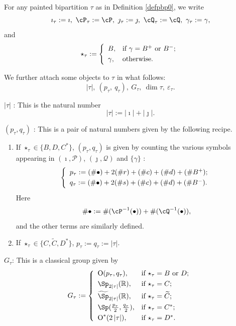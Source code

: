 \documentclass[11pt,a4paper]{amsart}
\def\abs#1{\left|{#1}\right|}
\newcommand{\CP}{{\mathcal {P}}}
\newcommand{\CQ}{{\mathcal {Q}}}
\newcommand{\oO}{\operatorname{O}}
\newcommand{\R}{\mathbb R}
\numberwithin{equation}{section}
\theoremstyle{remark}
\begin{document}
 For any painted bipartition $\tau$ as in Definition \ref{defpbp0}, we write
\[
  \imath_\tau:=\imath,\ \cP_\tau:=\cP,\  \jmath_\tau:=\jmath,\  \cQ_\tau:=\cQ,\ \gamma _\tau:=\gamma,
\]
and
\[
  \star_\tau:= \left\{
     \begin{array}{ll}
         B, &\hbox{if $\gamma=B^+$ or $B^-$}; \smallskip\\
            \gamma, & \hbox{otherwise}.           \end{array}
   \right.
  \]


We further attach some objects to $\tau$ in what follows:
 \[
  \abs{\tau}, \   (p_\tau, \ q_\tau), \ G_\tau, \ \dim \tau, \ \varepsilon_\tau .
 \]

\smallskip

\noindent $\abs{\tau}$ : This is the natural number \[
  \abs{\tau}:=\abs{\imath}+\abs{\jmath}.
\]

 \smallskip
 \smallskip

  \noindent $(p_{\tau}, q_{\tau})$ :
  This is a pair of natural numbers given by the following recipe.
 \begin{enumerate}[label=(\alph*)]
  \item
  If $\star_\tau\in \{B, D, C^*\}$, $(p_\tau, q_\tau)$ is given by counting  the various symbols appearing in $(\imath, \CP)$, $(\jmath, \CQ)$ and $\{\gamma\}$ :
  \begin{equation}\label{ptqt}
  \left\{
     \begin{array}{l}
    p_\tau :=( \# \bullet)+ 2 (\# r) +(\# c )+ (\# d) + (\# B^+);\smallskip\\
    q_\tau :=( \# \bullet)+ 2 (\# s) + (\# c) + (\# d) + (\# B^-).\\
    \end{array}
    \right.
\end{equation}
Here
\[
\#\bullet:=\#(\cP^{-1}(\bullet))+\#(\cQ^{-1}(\bullet)),
\]
and the other terms are similarly defined.
\item
If $\star_\tau\in \{C, \widetilde C, D^*\}$,  $p_\tau:=q_\tau:=\abs{\tau}$.
\end{enumerate}
\smallskip


 \smallskip


  \noindent $G_{\tau}$: This is a classical group given by
  \begin{equation}\label{def:Gt}
 G_\tau:= \left\{
     \begin{array}{ll}
         \oO(p_\tau, q_\tau), &\hbox{if $\star_\tau=B$ or $D$}; \smallskip\\
            \Sp_{2\abs{\tau}}(\R), &\hbox{if $\star_\tau=C$}; \smallskip\\
           \widetilde{\Sp}_{2\abs{\tau}}(\R), &\hbox{if $\star_\tau=\widetilde{ C}$}; \smallskip \\
        \Sp(\frac{p_\tau}{2}, \frac{q_\tau}{2}), &\hbox{if $\star_\tau=C^*$}; \smallskip \\
          \oO^*(2\abs{\tau}), &\hbox{if $\star_\tau=D^*$}.\\
            \end{array}
   \right.
\end{equation}
\end{document}
